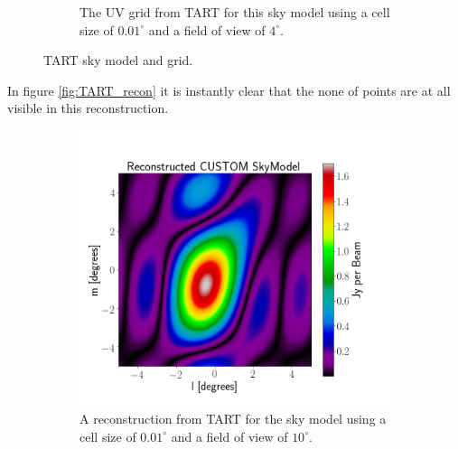 \begin{figure}[H]
\begin{subfigure}[b]{0.49\textwidth}
    \caption{The UV grid from TART for this sky model using a cell size of $0.01^\circ$ and a field of view of $4^\circ$.}
    \label{fig:TART_grid}
  \end{subfigure}
  \caption{TART sky model and grid.}
  \label{fig:TART}
 \end{figure}
 
In figure \ref{fig:TART_recon} it is instantly clear that the none of points are at all visible in this reconstruction.

\begin{figure}[H]
  \centering
  \begin{subfigure}[b]{0.49\textwidth}
    \centering
    \includegraphics[scale=0.3]{images/RECON_TART_4_POINT_CORRECT.png}
    \caption{A reconstruction from TART for the sky model using a cell size of $0.01^\circ$ and a field of view of $10^\circ$.}
    \label{fig:TART_recon_correct}
  \end{subfigure}
  \begin{subfigure}[b]{0.49\textwidth}
    \centering

\end{subfigure}
\end{figure}
